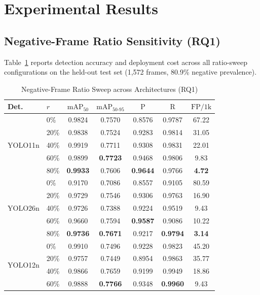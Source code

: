 \documentclass[conference]{IEEEtran}
\begin{document}
\section{Experimental Results}
\label{sec:results}

\subsection{Negative-Frame Ratio Sensitivity (RQ1)}
\label{subsec:rq1_results}
Table~\ref{tab:rq1} reports detection accuracy and deployment cost across all
ratio-sweep configurations on the held-out test set (1,572 frames, 80.9\%
negative prevalence).

\begin{table}[t]
\caption{Negative-Frame Ratio Sweep across Architectures (RQ1)}
\label{tab:rq1}
\centering
\setlength{\tabcolsep}{1.2pt}
\begin{tabular}{llccccc}
\toprule
\textbf{Det.} & \textbf{$r$} & \textbf{$\mathrm{mAP}_{50}$} &
\textbf{$\mathrm{mAP}_{50\text{-}95}$} & \textbf{$\mathrm{P}$} & \textbf{$\mathrm{R}$} &
\textbf{$\mathrm{FP/1k}$} \\
\midrule
\multirow{5}{*}{YOLO11n}
& 0\%  & 0.9824 & 0.7570 & 0.8576 & 0.9787 & 67.22 \\
& 20\% & 0.9838 & 0.7524 & 0.9283 & 0.9814 & 31.05 \\
& 40\% & 0.9919 & 0.7711 & 0.9308 & 0.9831 & 22.01 \\
& 60\% & 0.9899 & \textbf{0.7723} & 0.9468 & 0.9806 & 9.83 \\
& 80\% & \textbf{0.9933} & 0.7606 & \textbf{0.9644} & 0.9766 & \textbf{4.72} \\
\midrule
\multirow{5}{*}{YOLO26n}
& 0\%  & 0.9170 & 0.7086 & 0.8557 & 0.9105 & 80.59 \\
& 20\% & 0.9729 & 0.7546 & 0.9306 & 0.9763 & 16.90 \\
& 40\% & 0.9726 & 0.7388 & 0.9224 & 0.9519 & 9.43 \\
& 60\% & 0.9660 & 0.7594 & \textbf{0.9587} & 0.9086 & 10.22 \\
& 80\% & \textbf{0.9736} & \textbf{0.7671} & 0.9217 & \textbf{0.9794} & \textbf{3.14} \\
\midrule
\multirow{5}{*}{YOLO12n}
& 0\%  & 0.9910 & 0.7496 & 0.9228 & 0.9823 & 45.20 \\
& 20\% & 0.9757 & 0.7449 & 0.8954 & 0.9863 & 35.77 \\
& 40\% & 0.9866 & 0.7659 & 0.9199 & 0.9949 & 18.86 \\
& 60\% & 0.9888 & \textbf{0.7766} & 0.9348 & \textbf{0.9960} & 9.43 \\

\end{tabular}
\end{table}
\end{document}
